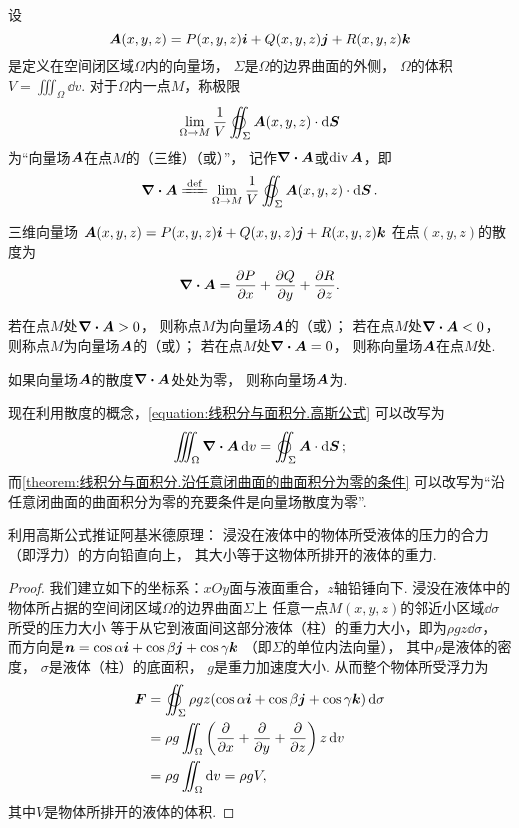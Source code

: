 \begin{definition}[空间中的散度]
\def\defofdiv{\lim_{\Omega \to M} \frac{1}{V} \varoiint_\Sigma \vb{A}(x,y,z) \cdot \dd{\vb{S}}}%
设\[
\boldsymbol{A}(x,y,z)=P(x,y,z)\boldsymbol{i}+Q(x,y,z)\boldsymbol{j}+R(x,y,z)\boldsymbol{k}
\]是定义在空间闭区域\(\Omega\)内的向量场，
\(\Sigma\)是\(\Omega\)的边界曲面的外侧，
\(\Omega\)的体积\(V = \iiint_\Omega \dd{v}\).
对于\(\Omega\)内一点\(M\)，称极限\[
	\defofdiv
\]为“向量场\(\boldsymbol{A}\)在点\(M\)的（三维）（或）”，
记作\(\div{\boldsymbol{A}}\)或\(\operatorname{div}\boldsymbol{A}\)，即\[
	\div{\vb{A}} \defeq \defofdiv.
\]
\end{definition}

\begin{proposition}
三维向量场
\(\boldsymbol{A}(x,y,z)=P(x,y,z)\boldsymbol{i}+Q(x,y,z)\boldsymbol{j}+R(x,y,z)\boldsymbol{k}\)
在点\((x,y,z)\)的散度为\[
	\div{\boldsymbol{A}} = \pdv{P}{x}+\pdv{Q}{y}+\pdv{R}{z}.
\]
\end{proposition}

\begin{definition}
若在点\(M\)处\(\div{\boldsymbol{A}}>0\)，
则称点\(M\)为向量场\(\boldsymbol{A}\)的（或）；
若在点\(M\)处\(\div{\boldsymbol{A}}<0\)，
则称点\(M\)为向量场\(\boldsymbol{A}\)的（或）；
若在点\(M\)处\(\div{\boldsymbol{A}}=0\)，
则称向量场\(\boldsymbol{A}\)在点\(M\)处.

如果向量场\(\boldsymbol{A}\)的散度\(\div{\boldsymbol{A}}\)处处为零，
则称向量场\(\boldsymbol{A}\)为.
\end{definition}

现在利用散度的概念，\cref{equation:线积分与面积分.高斯公式} 可以改写为
\begin{equation}\label{equation:线积分与面积分.高斯公式1}
	\iiint_\Omega \div{\vb{A}} \dd{v} = \varoiint_\Sigma \vb{A} \cdot \dd{\vb{S}};
\end{equation}
而\cref{theorem:线积分与面积分.沿任意闭曲面的曲面积分为零的条件}
可以改写为“沿任意闭曲面的曲面积分为零的充要条件是向量场散度为零”.

\begin{example}
利用高斯公式推证阿基米德原理：
浸没在液体中的物体所受液体的压力的合力（即浮力）的方向铅直向上，
其大小等于这物体所排开的液体的重力.
\begin{proof}
我们建立如下的坐标系：\(xOy\)面与液面重合，\(z\)轴铅锤向下.
浸没在液体中的物体所占据的空间闭区域\(\Omega\)的边界曲面\(\Sigma\)上
任意一点\(M(x,y,z)\)的邻近小区域\(\dd{\sigma}\)所受的压力大小
等于从它到液面间这部分液体（柱）的重力大小，即为\(\rho g z \dd{\sigma}\)，
而方向是\(\boldsymbol{n}=\cos\alpha\boldsymbol{i}+\cos\beta\boldsymbol{j}+\cos\gamma\boldsymbol{k}\)
（即\(\Sigma\)的单位内法向量），
其中\(\rho\)是液体的密度，
\(\sigma\)是液体（柱）的底面积，
\(g\)是重力加速度大小.
从而整个物体所受浮力为\begin{align*}
	\vb{F}
	&= \varoiint_\Sigma \rho g z
		(\cos\alpha\vb{i}+\cos\beta\vb{j}+\cos\gamma\vb{k}) \dd{\sigma} \\
	&= \rho g \iint_\Omega \left(\pdv{x}+\pdv{y}+\pdv{z}\right) z \dd{v} \\
	&= \rho g \iint_\Omega \dd{v}
	= \rho g V,
\end{align*}
其中\(V\)是物体所排开的液体的体积.
\end{proof}
\end{example}
